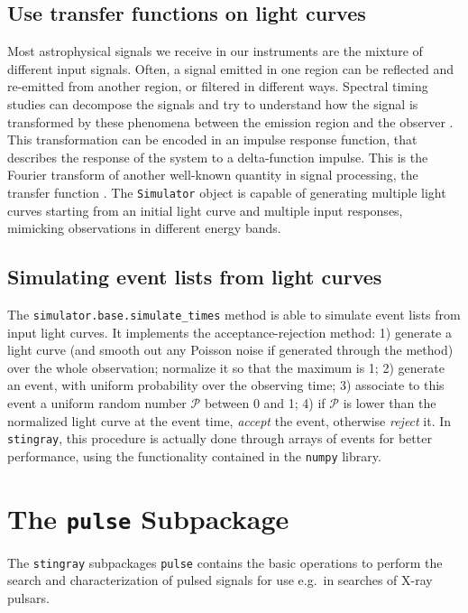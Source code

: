 \documentclass[twocolumn]{aastex62}
\newcommand{\stingray}{\texttt{stingray}\xspace}
\begin{document}
\subsection{Use transfer functions on light curves}
Most astrophysical signals we receive in our instruments are the mixture of different input signals. 
Often, a signal emitted in one region can be reflected and re-emitted from another region, or filtered in different ways. 
Spectral timing studies can decompose the signals and try to understand how the signal is transformed by these phenomena between the emission region and the observer \citep[see][for a review]{uttley2014}.
This transformation can be encoded in an impulse response function, that describes the response of the system to a delta-function impulse. 
This is the Fourier transform of another well-known quantity in signal processing, the transfer function \citep[see][]{girod2001signals}.
The \texttt{Simulator} object is capable of generating multiple light curves starting from an initial light curve and multiple input responses, mimicking observations in different energy bands. 

\subsection{Simulating event lists from light curves}
The \texttt{simulator.base.simulate\_times} method is able to simulate event lists from input light curves.
It implements the acceptance-rejection method: 
1) generate a light curve (and smooth out any Poisson noise if generated through the \citealt{timmer1995} method) over the whole observation; normalize it so that the maximum is 1; 
2) generate an event, with uniform probability over the observing time; 
3) associate to this event a uniform random number $\mathcal{P}$ between 0 and 1; 
4) if $\mathcal{P}$ is lower than the normalized light curve at the event time, \textit{accept} the event, otherwise \textit{reject} it.
In \stingray, this procedure is actually done through arrays of events for better performance, using the functionality contained in the \texttt{numpy} library.


\section{The \texttt{pulse} Subpackage}
\label{sec:pulsar}
The \stingray subpackages \texttt{pulse} contains the basic operations to perform the search and characterization of pulsed signals for use e.g.\ in searches of X-ray pulsars.
\end{document}
